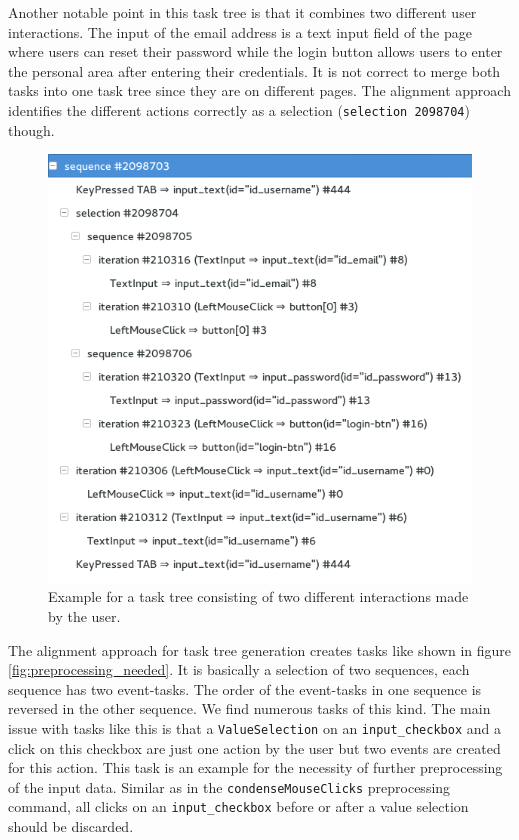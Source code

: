 Another notable point in this task tree is that it combines two different user interactions. 
The input of the email address is a text input field of the page where users can reset their password while the login button allows users to enter the personal area 
after entering their credentials. It is not correct to merge both tasks into one task tree since they are on different pages.
The alignment approach identifies the different actions correctly as a selection (\texttt{selection 2098704}) though. 

\begin{figure}[h]
	\centering
	\includegraphics[scale=0.75]{chapters/casestudy/mixedtasktree.png}
	\caption{Example for a task tree consisting of two different interactions made by the user.}
	\label{fig:mixedtasktree}
\end{figure}

The alignment approach for task tree generation creates tasks like shown in figure \ref{fig:preprocessing_needed}.
It is basically a selection of two sequences, each sequence has two event-tasks. 
The order of the event-tasks in one sequence is reversed in the other sequence.
We find numerous tasks of this kind.
The main issue with tasks like this is that a \texttt{ValueSelection} on an \texttt{input\_checkbox} and a click on this checkbox are just one action by the user but two events are created for this action.
This task is an example for the necessity of further preprocessing of the input data. 
Similar as in the \texttt{condenseMouseClicks} preprocessing command, all clicks on an \texttt{input\_checkbox} before or after a value selection should be discarded.

